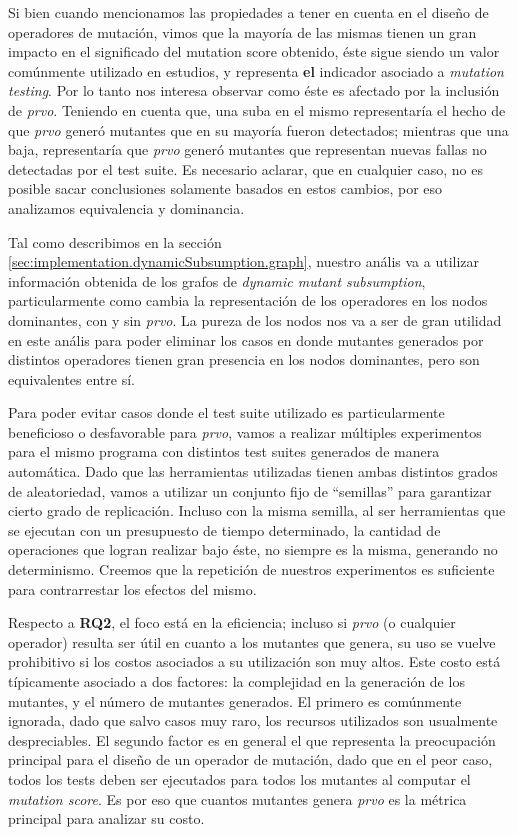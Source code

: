 Si bien cuando mencionamos las propiedades a tener en cuenta en el dise\~no de operadores de mutaci\'on, vimos que la mayor\'ia de las mismas tienen un gran impacto en el significado del mutation score obtenido, \'este sigue siendo un valor com\'unmente utilizado en estudios, y representa \textbf{el} indicador asociado a \emph{mutation testing}. Por lo tanto nos interesa observar como \'este es afectado por la inclusi\'on de \emph{prvo}. Teniendo en cuenta que, una suba en el mismo representar\'ia el hecho de que \emph{prvo} gener\'o mutantes que en su mayor\'ia fueron detectados; mientras que una baja, representar\'ia que \emph{prvo} gener\'o mutantes que representan nuevas fallas no detectadas por el test suite. Es necesario aclarar, que en cualquier caso, no es posible sacar conclusiones solamente basados en estos cambios, por eso analizamos equivalencia y dominancia.

Tal como describimos en la secci\'on \ref{sec:implementation.dynamicSubsumption.graph}, nuestro an\'alis va a utilizar informaci\'on obtenida de los grafos de \emph{dynamic mutant subsumption}, particularmente como cambia la representaci\'on de los operadores en los nodos dominantes, con y sin \emph{prvo}. La pureza de los nodos nos va a ser de gran utilidad en este an\'alis para poder eliminar los casos en donde mutantes generados por distintos operadores tienen gran presencia en los nodos dominantes, pero son equivalentes entre s\'i.

Para poder evitar casos donde el test suite utilizado es particularmente beneficioso o desfavorable para \emph{prvo}, vamos a realizar m\'ultiples experimentos para el mismo programa con distintos test suites generados de manera autom\'atica. Dado que las herramientas utilizadas tienen ambas distintos grados de aleatoriedad, vamos a utilizar un conjunto fijo de ``semillas'' para garantizar cierto grado de replicaci\'on. Incluso con la misma semilla, al ser herramientas que se ejecutan con un presupuesto de tiempo determinado, la cantidad de operaciones que logran realizar bajo \'este, no siempre es la misma, generando no determinismo. Creemos que la repetici\'on de nuestros experimentos es suficiente para contrarrestar los efectos del mismo.

Respecto a \textbf{RQ2}, el foco est\'a en la eficiencia; incluso si \emph{prvo} (o cualquier operador) resulta ser \'util en cuanto a los mutantes que genera, su uso se vuelve prohibitivo si los costos asociados a su utilizaci\'on son muy altos. Este costo est\'a t\'ipicamente asociado a dos factores: la complejidad en la generaci\'on de los mutantes, y el n\'umero de mutantes generados. El primero es com\'unmente ignorada, dado que salvo casos muy raro, los recursos utilizados son usualmente despreciables. El segundo factor es en general el que representa la preocupaci\'on principal para el dise\~no de un operador de mutaci\'on, dado que en el peor caso, todos los tests deben ser ejecutados para todos los mutantes al computar el \emph{mutation score}. Es por eso que cuantos mutantes genera \emph{prvo} es la m\'etrica principal para analizar su costo.


